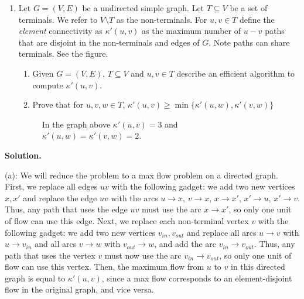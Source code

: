 \documentclass[11pt,letterpaper]{article}
\theoremstyle{definition}
\newcommand{\solution}{\medskip\noindent\textbf{Solution.}\par\medskip}
\begin{document}
\begin{enumerate}[resume=q]
\item Let $G = (V, E)$ be a undirected simple graph. Let $T \subseteq V$ be a set of terminals. We refer to $V \setminus T$ as the non-terminals. For $u, v \in T$ define the \emph{element} connectivity as $\kappa'(u, v)$ as the maximum number of $u-v$ paths that are disjoint in the non-terminals and edges of $G$. Note paths can share terminals. See the figure.
\begin{enumerate}
\item Given $G = (V, E)$, $T \subseteq V$ and $u, v \in T$ describe an efficient algorithm to compute $\kappa'(u, v)$.
\item Prove that for $u, v, w \in T$, $\kappa'(u, v) \geq \min\{\kappa'(u, w), \kappa'(v, w)\}$
\end{enumerate}

\begin{figure}[ht]
\centering
{}
\caption{In the graph above $\kappa'(u,v) = 3$ and $\kappa'(u,w) = \kappa'(v,w) = 2$.}
\label{fig:element-connectivity}
\end{figure}
\end{enumerate}

\solution
(a): We will reduce the problem to a max flow problem on a directed graph.
First, we replace all edges $uv$ with the following gadget: we add two new vertices $x,x'$ and replace the edge $uv$ with the arcs $u\to x$, $v\to x$, $x\to x'$, $x' \to u$, $x'\to v$.
Thus, any path that uses the edge $uv$ must use the arc $x\to x'$, so only one unit of flow can use this edge.
Next, we replace each non-terminal vertex $v$ with the following gadget: we add two new vertices $v_{in}, v_{out}$ and replace all arcs $u\to v$ with $u\to v_{in}$ and all arcs $v\to w$ with $v_{out}\to w$, and add the arc $v_{in}\to v_{out}$.
Thus, any path that uses the vertex $v$ must now use the arc $v_{in}\to v_{out}$, so only one unit of flow can use this vertex.
Then, the maximum flow from $u$ to $v$ in this directed graph is equal to $\kappa'(u,v)$, since a max flow corresponds to an element-disjoint flow in the original graph, and vice versa.
\end{document}
